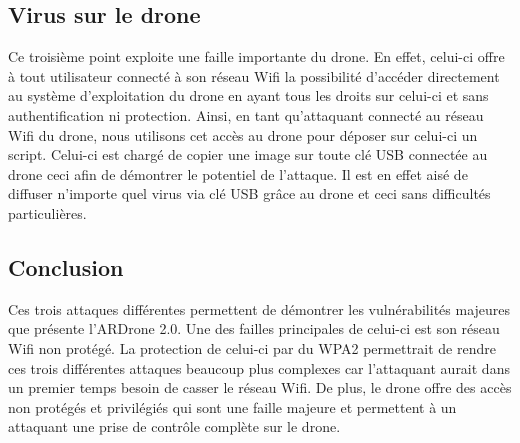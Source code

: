 \subsection{Virus sur le drone}
Ce troisième point exploite une faille importante du drone. En effet, celui-ci offre à tout utilisateur connecté à son réseau Wifi la possibilité d'accéder directement au système
d'exploitation du drone en ayant tous les droits sur celui-ci et sans authentification ni protection. Ainsi, en tant qu'attaquant connecté au réseau Wifi du drone, nous utilisons cet accès au drone pour déposer sur celui-ci un script. Celui-ci est chargé de copier une image sur toute clé USB connectée au drone ceci afin de démontrer le potentiel de l'attaque. Il est en effet aisé de diffuser n'importe quel virus via clé USB grâce au drone et ceci sans difficultés particulières.

\subsection{Conclusion}
Ces trois attaques différentes permettent de démontrer les vulnérabilités majeures que présente l'ARDrone 2.0. Une des failles principales de celui-ci est son réseau Wifi non protégé. La protection de celui-ci par du WPA2 permettrait de rendre ces trois différentes attaques beaucoup plus complexes car l'attaquant aurait dans un premier temps besoin de casser le réseau Wifi. De plus, le drone offre des accès non protégés et privilégiés qui sont une faille majeure et permettent à un attaquant une prise de contrôle complète sur le drone.
